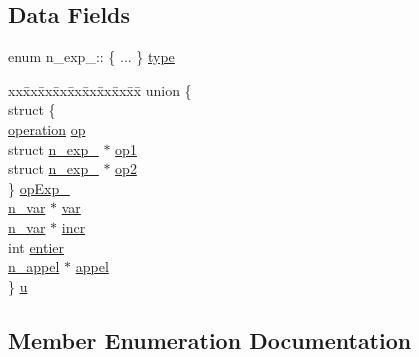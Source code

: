 \subsection*{Data Fields}
\begin{DoxyCompactItemize}
\item 
enum n\+\_\+exp\+\_\+\+:: \{ ... \}  \hyperlink{structn__exp___a885a8dfa3936b9f7161a86c710b0295d}{type}
\item 
\begin{tabbing}
xx\=xx\=xx\=xx\=xx\=xx\=xx\=xx\=xx\=\kill
union \{\\
\>struct \{\\
\>\>\hyperlink{syntabs_8h_ad34e7fb3c33543e9f3a1e48486fa7692}{operation} \hyperlink{structn__exp___a0fbfb77ce24ca76ebb3d14c08eff495e}{op}\\
\>\>struct \hyperlink{structn__exp__}{n\_exp\_} $\ast$ \hyperlink{structn__exp___a77b0f52635f46b119b79c76ffa9ecb13}{op1}\\
\>\>struct \hyperlink{structn__exp__}{n\_exp\_} $\ast$ \hyperlink{structn__exp___af1d5707ba3f56f28de64916ec6883d06}{op2}\\
\>\} \hyperlink{structn__exp___adcf66bf19213c70f9fa7f7b492a003de}{opExp\_}\\
\>\hyperlink{syntabs_8h_ab219ef4489b1e38a9427841614795796}{n\_var} $\ast$ \hyperlink{structn__exp___ac87b093b17ae6635f33ca65b7343e9fe}{var}\\
\>\hyperlink{syntabs_8h_ab219ef4489b1e38a9427841614795796}{n\_var} $\ast$ \hyperlink{structn__exp___a7084c09985f01b8c9f84fa7484095e44}{incr}\\
\>int \hyperlink{structn__exp___aa93b6c7dbc1b7b96048e03d19cd6a787}{entier}\\
\>\hyperlink{syntabs_8h_aef001b26fda49a7fbaf2f68c86313f3d}{n\_appel} $\ast$ \hyperlink{structn__exp___a5d0fe44c9580c72986708e6527158164}{appel}\\
\} \hyperlink{structn__exp___a8c4088fb555e77092073185e713cb224}{u}\\

\end{tabbing}\end{DoxyCompactItemize}


\subsection{Member Enumeration Documentation}
